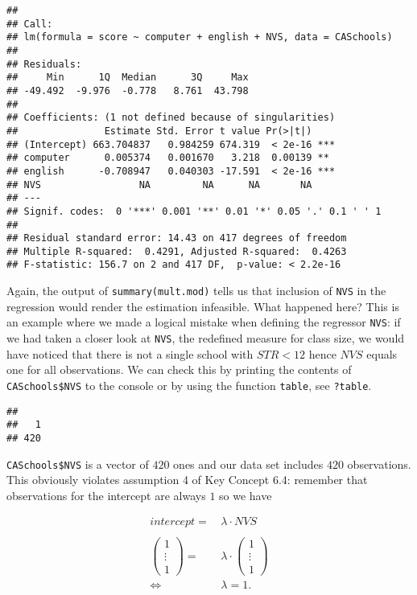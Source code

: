 \documentclass[]{book}
\newenvironment{Shaded}{\begin{snugshade}}{\end{snugshade}}
\newcommand{\KeywordTok}[1]{\textcolor[rgb]{0.13,0.29,0.53}{\textbf{#1}}}
\newcommand{\OperatorTok}[1]{\textcolor[rgb]{0.81,0.36,0.00}{\textbf{#1}}}
\newcommand{\NormalTok}[1]{#1}
\theoremstyle{definition}
\theoremstyle{definition}
\theoremstyle{definition}
\theoremstyle{remark}
\begin{document}
\begin{verbatim}
## 
## Call:
## lm(formula = score ~ computer + english + NVS, data = CASchools)
## 
## Residuals:
##     Min      1Q  Median      3Q     Max 
## -49.492  -9.976  -0.778   8.761  43.798 
## 
## Coefficients: (1 not defined because of singularities)
##               Estimate Std. Error t value Pr(>|t|)    
## (Intercept) 663.704837   0.984259 674.319  < 2e-16 ***
## computer      0.005374   0.001670   3.218  0.00139 ** 
## english      -0.708947   0.040303 -17.591  < 2e-16 ***
## NVS                 NA         NA      NA       NA    
## ---
## Signif. codes:  0 '***' 0.001 '**' 0.01 '*' 0.05 '.' 0.1 ' ' 1
## 
## Residual standard error: 14.43 on 417 degrees of freedom
## Multiple R-squared:  0.4291, Adjusted R-squared:  0.4263 
## F-statistic: 156.7 on 2 and 417 DF,  p-value: < 2.2e-16
\end{verbatim}

Again, the output of \texttt{summary(mult.mod)} tells us that inclusion
of \texttt{NVS} in the regression would render the estimation
infeasible. What happened here? This is an example where we made a
logical mistake when defining the regressor \texttt{NVS}: if we had
taken a closer look at \texttt{NVS}, the redefined measure for class
size, we would have noticed that there is not a single school with
\(STR<12\) hence \(NVS\) equals one for all observations. We can check
this by printing the contents of \texttt{CASchools\$NVS} to the console
or by using the function \texttt{table}, see \texttt{?table}.

\begin{Shaded}
\end{Shaded}

\begin{verbatim}
## 
##   1 
## 420
\end{verbatim}

\texttt{CASchools\$NVS} is a vector of \(420\) ones and our data set
includes \(420\) observations. This obviously violates assumption 4 of
Key Concept 6.4: remember that observations for the intercept are always
\(1\) so we have

\begin{align}
  intercept = \, & \lambda \cdot NVS \\
  \\
  \begin{pmatrix} 1 \\ \vdots \\ 1\end{pmatrix} = \, & \lambda \cdot \begin{pmatrix} 1 \\ \vdots \\ 1\end{pmatrix} \\   \Leftrightarrow \, & \lambda = 1.
\end{align}
\end{document}
